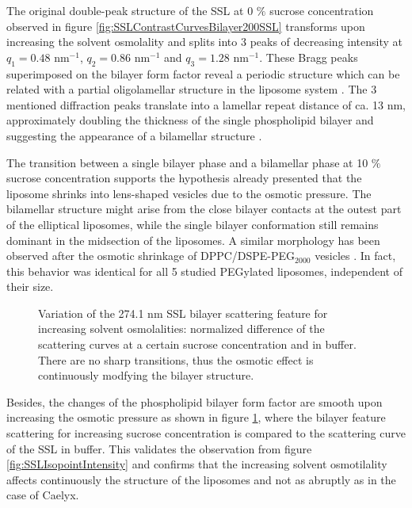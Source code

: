 The original double-peak structure of the SSL at 0 $\%$ sucrose concentration observed in figure \ref{fig:SSLContrastCurvesBilayer200SSL} transforms upon increasing the solvent osmolality and splits into 3 peaks of decreasing intensity at $q_1=0.48$ nm$^{-1}$, $q_2=0.86$ nm$^{-1}$ and $q_3=1.28$ nm$^{-1}$. These Bragg peaks superimposed on the bilayer form factor reveal a periodic structure which can be related with a partial oligolamellar structure in the liposome system \cite{fernandez_influence_2008}. The 3 mentioned diffraction peaks translate into a lamellar repeat distance of ca. 13 nm, approximately doubling the thickness of the single phospholipid bilayer \cite{kenworthy_range_1995} and suggesting the appearance of a bilamellar structure \cite{deme_giant_2002}. 

The transition between a single bilayer phase and a bilamellar phase at 10 $\%$ sucrose concentration supports the hypothesis already presented that the liposome shrinks into lens-shaped vesicles due to the osmotic pressure. The bilamellar structure might arise from the close bilayer contacts at the outest part of the elliptical liposomes, while the single bilayer conformation still remains dominant in the midsection of the liposomes. A similar morphology has been observed after the osmotic shrinkage of DPPC/DSPE-PEG$_{2000}$ vesicles \cite{terreno_osmotically_2009}. In fact, this behavior was identical for all 5 studied PEGylated liposomes, independent of their size. 

\begin{figure}
	\centering
		
		\caption{Variation of the 274.1 nm SSL bilayer scattering feature for increasing solvent osmolalities: normalized difference of the scattering curves at a certain sucrose concentration and in buffer. There are no sharp transitions, thus the osmotic effect is continuously modfying the bilayer structure.}
		\label{fig:SSLContrastVariationChiSquared400SSL}
\end{figure}

Besides, the changes of the phospholipid bilayer form factor are smooth upon increasing the osmotic pressure as shown in figure \ref{fig:SSLContrastVariationChiSquared400SSL}, where the bilayer feature scattering for increasing sucrose concentration is compared to the scattering curve of the SSL in buffer. This validates the observation from figure \ref{fig:SSLIsopointIntensity} and confirms that the increasing solvent osmotilality affects continuously the structure of the liposomes and not as abruptly as in the case of Caelyx.

